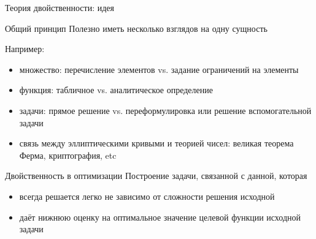 \documentclass[12pt]{beamer}
\begin{document}
\begin{frame}{Теория двойственности: идея}
\vspace{-2mm}
\begin{block}{Общий принцип}
Полезно иметь несколько взглядов на одну сущность
\end{block}
{\footnotesize
Например:
\vspace{-1mm}
\begin{itemize}
\item множество: перечисление элементов vs. задание ограничений на элементы
\item функция: табличное vs. аналитическое определение
\item задачи: прямое решение vs. переформулировка или решение вспомогательной задачи
\item связь между эллиптическими кривыми и теорией чисел: великая теорема Ферма, криптография, etc
\end{itemize}
}
\vspace{-3mm}
\begin{block}{Двойственность в оптимизации}
\scriptsize
Построение задачи, связанной с данной, которая
\begin{itemize}
\vspace{-1mm}
\item всегда решается легко не зависимо от сложности решения исходной 
\vspace{-1mm}
\item даёт нижнюю оценку на оптимальное значение целевой функции исходной задачи
\end{itemize}
\end{block}
\end{frame}
\end{document}
